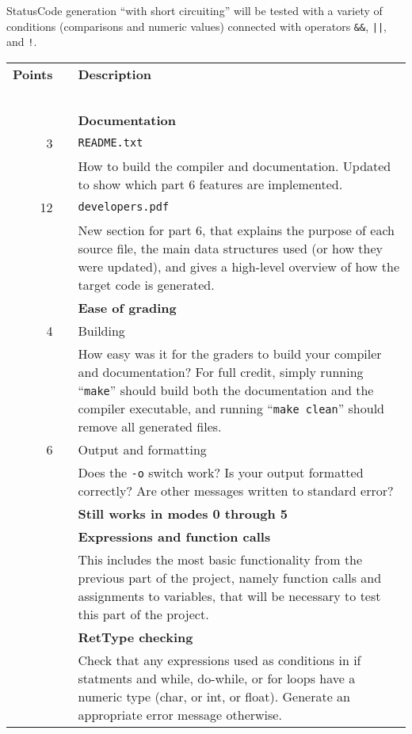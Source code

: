 \documentclass{article}
\makeatletter
\newcommand{\codegen}{5}
\newcommand{\flowgen}{6}
\newcommand{\gradeline}{ \cline{1-2} \cline{4-4} ~\\[-1.5ex] }
\newenvironment{gradetable}{\begin{longtable}{@{~~}rrcp{5in}} \multicolumn{2}{l}{\bf Points} & & {\bf Description}\\ \gradeline}{\end{longtable}}
\newcommand{\mainitem}[2]{\pagebreak[2] {\bf #1} &&& {\bf #2}}
\newcommand{\mainpara}[1]{~ &&& {#1} }
\newcommand{\inneritem}[2]{~ & #1 && #2}
\newcommand{\innerpara}[1]{~ & ~ && #1}
\makeatother
\begin{document}
StatusCode generation ``with short circuiting''
will be tested with a variety of conditions
(comparisons and numeric values)
connected with operators \verb|&&|, \verb+||+, and \verb|!|.


\noindent
\begin{gradetable}
  \mainitem{15}{Documentation}
  \\[1mm]
  \inneritem{3}{\tt README.txt}
  \\[1mm]
  \innerpara{%
    How to build the compiler and documentation.
    Updated to show which part \flowgen{} features are implemented.
  }
  \\[1mm]
  \inneritem{12}{\tt developers.pdf}
  \\[1mm]
  \innerpara{%
    New section for part \flowgen{}, that explains
    the purpose of each source file,
    the main data structures used (or how they were updated),
    and gives a high-level overview of how the target code
    is generated.
  }
  \\[4mm]

  \mainitem{10}{Ease of grading}
  \\[1mm]
  \inneritem{4}{Building}
  \\[1mm]
  \innerpara{%
    How easy was it for the graders to build your compiler and
    documentation?
    For full credit, simply running ``{\tt make}''
    should build both the documentation and the compiler executable,
    and running ``{\tt make clean}'' should remove
    all generated files.
  }
  \\[1mm]
  \inneritem{6}{Output and formatting}
  \\[1mm]
  \innerpara{%
    Does the {\tt -o} switch work?
    Is your output formatted correctly?
    Are other messages written to standard error?
  }
  \\[4mm]

  \mainitem{10}{Still works in modes 0 through \codegen}
  \\[4mm]

  \mainitem{15}{Expressions and function calls}
  \\[1mm]
  \mainpara{%
    This includes the most basic functionality from the previous part of the
    project, namely function calls and assignments to variables,
    that will be necessary to test this part of the project.
  }
  \\[4mm]

  \mainitem{5}{RetType checking}
  \\[1mm]
  \mainpara{%
    Check that any expressions used as conditions in if statments
    and while, do-while, or for loops
    have a numeric type (char, or int, or float).
    Generate an appropriate error message otherwise.
  }
  \\[4mm]


\end{gradetable}
\end{document}
